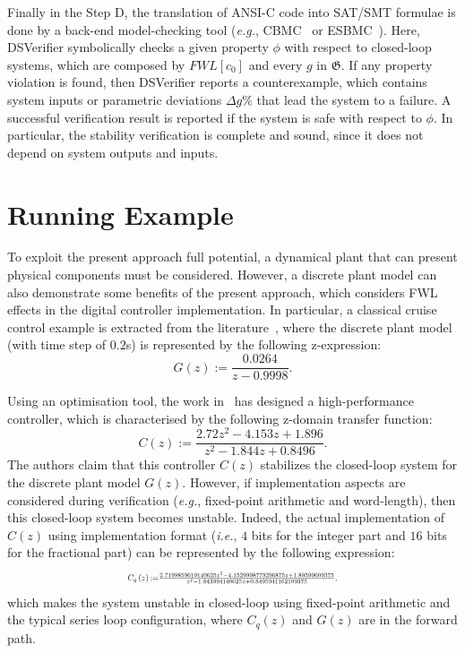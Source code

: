 \documentclass{sig-alternate-05-2015}
\begin{document}
Finally in the Step D, the translation of ANSI-C code into SAT/SMT formulae
is done by a back-end model-checking tool ({\it e.g.},
CBMC~\cite{ClarkeKL04} or ESBMC~\cite{CordeiroFM12}).  Here, DSVerifier
symbolically checks a given property $\phi$ with respect to closed-loop
systems, which are composed by $FWL[c_0]$ and every $g$ in $\mathfrak{G}$. 
If any property violation is found, then DSVerifier reports a
counterexample, which contains system inputs or parametric deviations
$\Delta{g}\%$ that lead the system to a failure.  A successful verification
result is reported if the system is safe with respect to $\phi$.  In
particular, the stability verification is complete and sound, since it does
not depend on system outputs and inputs.

\section{Running Example} \label{sec:running-ex}

To exploit the present approach full potential, a dynamical plant that can present 
physical components must be considered. However, a discrete plant model can also demonstrate 
some benefits of the present approach, which considers FWL effects in the digital 
controller implementation. In particular, a classical cruise control example 
is extracted from the literature~\cite{Astrom08}, where the discrete plant model (with time step
of $0.2$s) is represented by the following z-expression:
%
\begin{equation}
\label{Eq:running-example-plant}
G\left(z\right) := \frac{0.0264}{z-0.9998}.
\end{equation}

Using an optimisation tool, the work in~\cite{DBLP:conf/hybrid/WangGRJF16} has designed 
a high-performance controller, which is characterised by the following z-domain transfer function:
\begin{equation}
\label{Eq:running-example-controller}
C\left(z\right) := \frac{2.72z^2 - 4.153z + 1.896}{z^2 - 1.844z + 0.8496}.
\end{equation}
The authors claim that this controller $C(z)$ stabilizes the closed-loop system for the discrete plant model $G(z)$.  
However, if implementation aspects are considered during verification ({\it e.g.}, fixed-point arithmetic 
and word-length), then this closed-loop system becomes unstable.
%
Indeed, the actual implementation of $C(z)$ using  implementation format 
({\it i.e.}, $4$ bits for the integer part and $16$ bits for the fractional part)
can be represented by the following expression: 
\begin{equation}
\label{Eq:running-example-controller-quantized}
\resizebox{0.5\textwidth}{!}{
$C_{q}\left(z\right) {:=} \frac{2.7199859619140625z^2{-}4.1529998779296875z
{+}1.89599609375}{z^2{-}1.843994140625z+0.8495941162109375},$
}
\end{equation} 
which makes the system unstable in closed-loop using fixed-point arithmetic and 
the typical series loop configuration, where $C_{q}\left(z\right)$ and $G\left(z\right)$ 
are in the forward path.
\end{document}
